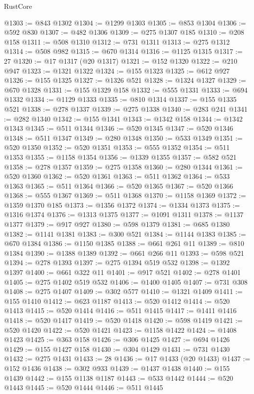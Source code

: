 \begin{lexlean}{RustCore}
\begin{coremodule}
@1303 := @843 @1302
@1304 := @1299 @1303
@1305 := @853 @1304
@1306 := @592 @830
@1307 := @482 @1306
@1309 := @275 @1307 @185
@1310 := @208 @158
@1311 := @508 @1310
@1312 := @731 @1311
@1313 := @275 @1312
@1314 := @508 @982
@1315 := @670 @1314
@1316 := @1125 @1315
@1317 := 27
@1320 := @17 @1317 (@20 @1317)
@1321 := @152 @1320
@1322 := @210 @947
@1323 := @1321 @1322
@1324 := @155 @1323
@1325 := @612 @927
@1326 := @155 @1325
@1327 := @1326 @521
@1328 := @1324 @1327
@1329 := @670 @1328
@1331 := @155 @1329 @158
@1332 := @555 @1331
@1333 := @694 @1332
@1334 := @1129 @1333
@1335 := @810 @1314
@1337 := @155 @1335 @521
@1338 := @278 @1337
@1339 := @275 @1338
@1340 := @283 @241
@1341 := @282 @1340
@1342 := @155 @1341
@1343 := @1342 @158
@1344 := @1342 @1343
@1345 := @511 @1344
@1346 := @520 @1345
@1347 := @520 @1346
@1348 := @511 @1347
@1349 := @280 @1348
@1350 := @533 @1349
@1351 := @520 @1350
@1352 := @520 @1351
@1353 := @555 @1352
@1354 := @511 @1353
@1355 := @1158 @1354
@1356 := @1339 @1355
@1357 := @582 @521
@1358 := @278 @1357
@1359 := @275 @1358
@1360 := @280 @1344
@1361 := @520 @1360
@1362 := @520 @1361
@1363 := @511 @1362
@1364 := @533 @1363
@1365 := @511 @1364
@1366 := @520 @1365
@1367 := @520 @1366
@1368 := @555 @1367
@1369 := @511 @1368
@1370 := @1158 @1369
@1372 := @1359 @1370 @185
@1373 := @1356 @1372
@1374 := @1334 @1373
@1375 := @1316 @1374
@1376 := @1313 @1375
@1377 := @1091 @1311
@1378 := @1137 @1377
@1379 := @917 @927
@1380 := @598 @1379
@1381 := @685 @1380
@1382 := @1141 @1381
@1383 := @300 @521
@1384 := @1144 @1383
@1385 := @670 @1384
@1386 := @1150 @1385
@1388 := @661 @261 @11
@1389 := @810 @1384
@1390 := @1388 @1389
@1392 := @661 @266 @11
@1393 := @598 @521
@1394 := @278 @1393
@1397 := @275 @1394 @519 @532
@1398 := @1392 @1397
@1400 := @661 @322 @11
@1401 := @917 @521
@1402 := @278 @1401
@1405 := @275 @1402 @519 @532
@1406 := @1400 @1405
@1407 := @731 @308
@1408 := @275 @1407
@1409 := @302 @577
@1410 := @1321 @1409
@1411 := @155 @1410
@1412 := @623 @1187
@1413 := @520 @1412
@1414 := @520 @1413
@1415 := @520 @1414
@1416 := @511 @1415
@1417 := @1411 @1416
@1418 := @520 @1417
@1419 := @520 @1418
@1420 := @598 @1419
@1421 := @520 @1420
@1422 := @520 @1421
@1423 := @1158 @1422
@1424 := @1408 @1423
@1425 := @363 @158
@1426 := @306 @1425
@1427 := @694 @1426
@1429 := @155 @1427 @158
@1430 := @304 @1429
@1431 := @731 @1430
@1432 := @275 @1431
@1433 := 28
@1436 := @17 @1433 (@20 @1433)
@1437 := @152 @1436
@1438 := @302 @933
@1439 := @1437 @1438
@1440 := @155 @1439
@1442 := @155 @1138 @1187
@1443 := @533 @1442
@1444 := @520 @1443
@1445 := @520 @1444
@1446 := @511 @1445

\end{coremodule}
\end{lexlean}
